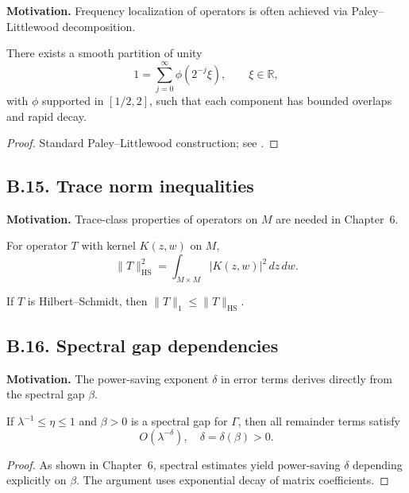 \noindent
\textbf{Motivation.}
Frequency localization of operators is often achieved via Paley–Littlewood
decomposition.

\begin{lemma}\label{lem:paley-littlewood}
There exists a smooth partition of unity
\[
1 = \sum_{j=0}^\infty \phi(2^{-j}\xi), \qquad \xi\in\mathbb R,
\]
with $\phi$ supported in $[1/2,2]$, such that each component has bounded overlaps
and rapid decay.
\end{lemma}

\begin{proof}
Standard Paley–Littlewood construction; see \cite[Chap.~1]{Grafakos2014}.
\end{proof}

\subsection*{B.15. Trace norm inequalities}

\noindent
\textbf{Motivation.}
Trace-class properties of operators on $M$ are needed in Chapter~6.

\begin{lemma}\label{lem:hilbert-schmidt}
For operator $T$ with kernel $K(z,w)$ on $M$,
\[
\|T\|_{\mathrm{HS}}^2 = \int_{M\times M} |K(z,w)|^2\,dz\,dw.
\]
\end{lemma}

\begin{corollary}\label{cor:trace}
If $T$ is Hilbert–Schmidt, then $\|T\|_1 \le \|T\|_{\mathrm{HS}}$.
\end{corollary}

\subsection*{B.16. Spectral gap dependencies}

\noindent
\textbf{Motivation.}
The power-saving exponent $\delta$ in error terms derives directly from
the spectral gap $\beta$.

\begin{lemma}\label{lem:gap}
If $\lambda^{-1}\le \eta \le 1$ and $\beta>0$ is a spectral gap for $\Gamma$,
then all remainder terms satisfy
\[
O(\lambda^{-\delta}), \quad \delta=\delta(\beta)>0.
\]
\end{lemma}

\begin{proof}
As shown in Chapter~6, spectral estimates yield power-saving $\delta$ depending
explicitly on $\beta$. The argument uses exponential decay of matrix coefficients.
\end{proof}

